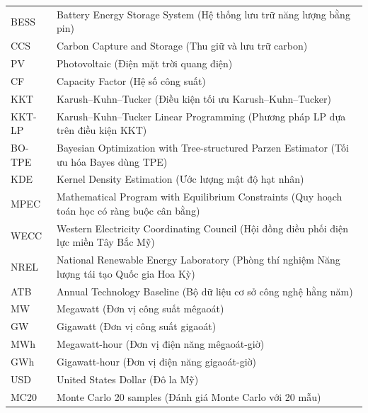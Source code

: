 \documentclass[12pt, a4paper]{report}
\begin{document}
\begin{longtable}{@{}p{3.0cm}p{11.5cm}@{}}
  BESS  & Battery Energy Storage System (Hệ thống lưu trữ năng lượng bằng pin) \\
  CCS   & Carbon Capture and Storage (Thu giữ và lưu trữ carbon) \\
  PV    & Photovoltaic (Điện mặt trời quang điện) \\
  CF    & Capacity Factor (Hệ số công suất) \\
  KKT   & Karush--Kuhn--Tucker (Điều kiện tối ưu Karush--Kuhn--Tucker) \\
  KKT-LP & Karush--Kuhn--Tucker Linear Programming (Phương pháp LP dựa trên điều kiện KKT) \\
  BO-TPE & Bayesian Optimization with Tree-structured Parzen Estimator (Tối ưu hóa Bayes dùng TPE) \\
  KDE   & Kernel Density Estimation (Ước lượng mật độ hạt nhân) \\
  MPEC  & Mathematical Program with Equilibrium Constraints (Quy hoạch toán học có ràng buộc cân bằng) \\
  WECC  & Western Electricity Coordinating Council (Hội đồng điều phối điện lực miền Tây Bắc Mỹ) \\
  NREL  & National Renewable Energy Laboratory (Phòng thí nghiệm Năng lượng tái tạo Quốc gia Hoa Kỳ) \\
  ATB   & Annual Technology Baseline (Bộ dữ liệu cơ sở công nghệ hằng năm) \\
  MW    & Megawatt (Đơn vị công suất mêgaoát) \\
  GW    & Gigawatt (Đơn vị công suất gigaoát) \\
  MWh   & Megawatt-hour (Đơn vị điện năng mêgaoát-giờ) \\
  GWh   & Gigawatt-hour (Đơn vị điện năng gigaoát-giờ) \\
  USD   & United States Dollar (Đô la Mỹ) \\
  MC20  & Monte Carlo 20 samples (Đánh giá Monte Carlo với 20 mẫu) \\
  \bottomrule
\end{longtable}


\newpage
{}
\setcounter{page}{1}


\end{document}
